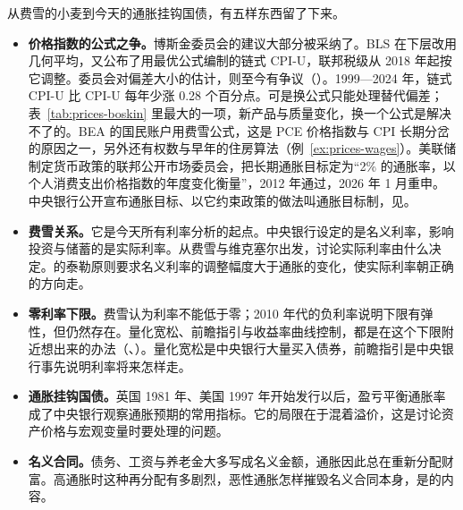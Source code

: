 从费雪的小麦到今天的通胀挂钩国债，有五样东西留了下来。
\begin{itemize}
\item \textbf{价格指数的公式之争。}博斯金委员会的建议大部分被采纳了。BLS 在下层改用几何平均，又公布了用最优公式编制的链式 CPI-U，联邦税级从 2018 年起按它调整\cite{pl115_97}。委员会对偏差大小的估计，则至今有争议（）。1999—2024 年，链式 CPI-U 比 CPI-U 每年少涨 0.28 个百分点。可是换公式只能处理替代偏差；表~\ref{tab:prices-boskin} 里最大的一项，新产品与质量变化，换一个公式是解决不了的。BEA 的国民账户用费雪公式，这是 PCE 价格指数与 CPI 长期分岔的原因之一，另外还有权数与早年的住房算法（例~\ref{ex:prices-wages}）。美联储制定货币政策的联邦公开市场委员会，把长期通胀目标定为“2\% 的通胀率，以个人消费支出价格指数的年度变化衡量”，2012 年通过，2026 年 1 月重申\cite{fomc2026}。中央银行公开宣布通胀目标、以它约束政策的做法叫通胀目标制，见。

\item \textbf{费雪关系。}它是今天所有利率分析的起点。中央银行设定的是名义利率，影响投资与储蓄的是实际利率。从费雪与维克塞尔出发，讨论实际利率由什么决定。的泰勒原则要求名义利率的调整幅度大于通胀的变化，使实际利率朝正确的方向走。

\item \textbf{零利率下限。}费雪认为利率不能低于零；2010 年代的负利率说明下限有弹性，但仍然存在。量化宽松、前瞻指引与收益率曲线控制，都是在这个下限附近想出来的办法（、）。量化宽松是中央银行大量买入债券，前瞻指引是中央银行事先说明利率将来怎样走。

\item \textbf{通胀挂钩国债。}英国 1981 年、美国 1997 年开始发行以后，盈亏平衡通胀率成了中央银行观察通胀预期的常用指标。它的局限在于混着溢价，这是讨论资产价格与宏观变量时要处理的问题。

\item \textbf{名义合同。}债务、工资与养老金大多写成名义金额，通胀因此总在重新分配财富。高通胀时这种再分配有多剧烈，恶性通胀怎样摧毁名义合同本身，是的内容。
\end{itemize}

